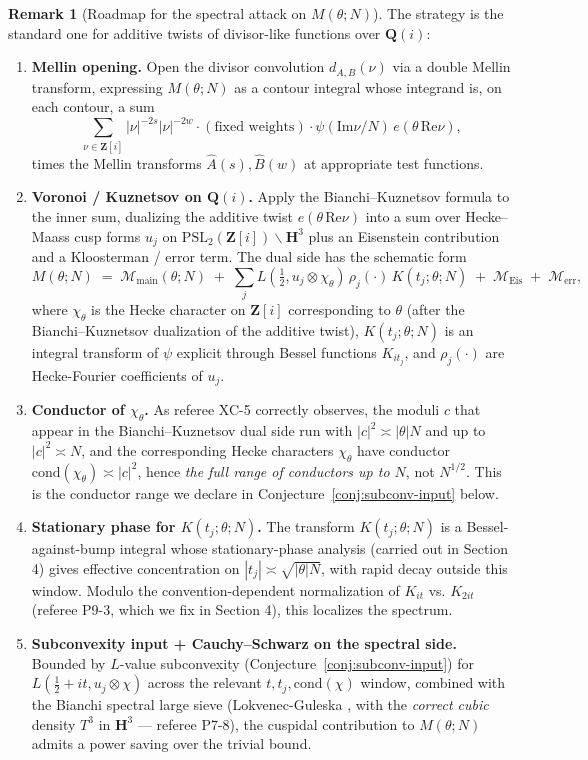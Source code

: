 \documentclass[11pt]{article}
\theoremstyle{definition}
\newtheorem{remark}[theorem]{Remark}
\newcommand{\Z}{\mathbf{Z}}
\newcommand{\Q}{\mathbf{Q}}
\newcommand{\HH}{\mathbf{H}}
\newcommand{\Zi}{\Z[i]}
\newcommand{\Qi}{\Q(i)}
\renewcommand{\Re}{\mathrm{Re}}
\renewcommand{\Im}{\mathrm{Im}}
\newcommand{\cond}{\mathrm{cond}}
\begin{document}
\begin{remark}[Roadmap for the spectral attack on $M(\theta;N)$]\label{rmk:M-roadmap}
The strategy is the standard one for additive twists of divisor-like functions over $\Qi$:
\begin{enumerate}
\item[(S3.1)] \textbf{Mellin opening.} Open the divisor convolution $d_{A,B}(\nu)$ via a double Mellin transform, expressing $M(\theta;N)$ as a contour integral whose integrand is, on each contour, a sum
\[
\sum_{\nu\in\Zi}|\nu|^{-2s}|\nu|^{-2w}\cdot(\text{fixed weights})\cdot\psi(\Im\nu/N)\,e(\theta\,\Re\nu),
\]
times the Mellin transforms $\widehat A(s),\widehat B(w)$ at appropriate test functions.
\item[(S3.2)] \textbf{Voronoi / Kuznetsov on $\Qi$.} Apply the Bianchi--Kuznetsov formula \cite{LG} to the inner sum, dualizing the additive twist $e(\theta\,\Re\nu)$ into a sum over Hecke--Maass cusp forms $u_j$ on $\mathrm{PSL}_2(\Zi)\backslash\HH^3$ plus an Eisenstein contribution and a Kloosterman / error term. The dual side has the schematic form
\[
M(\theta;N)\;=\;\mathcal M_{\mathrm{main}}(\theta;N)\;+\;\sum_j L(\tfrac12,u_j\otimes\chi_\theta)\,\rho_j(\cdot)\,K(t_j;\theta;N)\;+\;\mathcal M_{\mathrm{Eis}}\;+\;\mathcal M_{\mathrm{err}},
\]
where $\chi_\theta$ is the Hecke character on $\Zi$ corresponding to $\theta$ (after the Bianchi--Kuznetsov dualization of the additive twist), $K(t_j;\theta;N)$ is an integral transform of $\psi$ explicit through Bessel functions $K_{it_j}$, and $\rho_j(\cdot)$ are Hecke-Fourier coefficients of $u_j$.
\item[(S3.3)] \textbf{Conductor of $\chi_\theta$.} As referee XC-5 correctly observes, the moduli $c$ that appear in the Bianchi--Kuznetsov dual side run with $|c|^2\asymp |\theta|N$ and up to $|c|^2\asymp N$, and the corresponding Hecke characters $\chi_\theta$ have conductor $\cond(\chi_\theta)\asymp |c|^2$, hence \emph{the full range of conductors up to $N$}, not $N^{1/2}$. This is the conductor range we declare in Conjecture~\ref{conj:subconv-input} below.
\item[(S4.1)] \textbf{Stationary phase for $K(t_j;\theta;N)$.} The transform $K(t_j;\theta;N)$ is a Bessel-against-bump integral whose stationary-phase analysis (carried out in Section 4) gives effective concentration on $|t_j|\asymp \sqrt{|\theta|N}$, with rapid decay outside this window. Modulo the convention-dependent normalization of $K_{it}$ vs. $K_{2it}$ (referee P9-3, which we fix in Section 4), this localizes the spectrum.
\item[(S4.2)] \textbf{Subconvexity input + Cauchy--Schwarz on the spectral side.} Bounded by $L$-value subconvexity (Conjecture~\ref{conj:subconv-input}) for $L(\tfrac12+it,u_j\otimes\chi)$ across the relevant $t,t_j,\cond(\chi)$ window, combined with the Bianchi spectral large sieve (Lokvenec-Guleska \cite{LG}, with the \emph{correct cubic} density $T^3$ in $\HH^3$ --- referee P7-8), the cuspidal contribution to $M(\theta;N)$ admits a power saving over the trivial bound.

\end{enumerate}
\end{remark}
\end{document}

